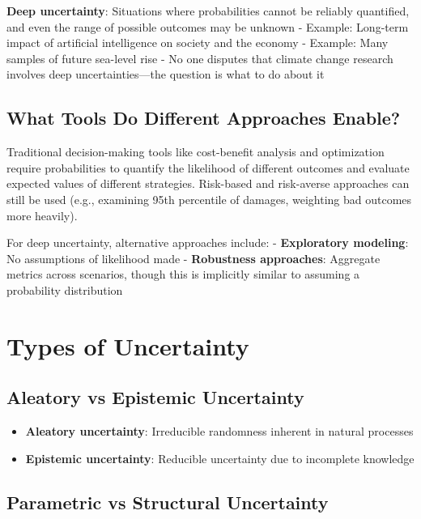 \documentclass[
  letterpaper,
  DIV=11,
  numbers=noendperiod]{scrreprt}
\providecommand{\tightlist}{%
  \setlength{\itemsep}{0pt}\setlength{\parskip}{0pt}}
\begin{document}
\textbf{Deep uncertainty}: Situations where probabilities cannot be
reliably quantified, and even the range of possible outcomes may be
unknown - Example: Long-term impact of artificial intelligence on
society and the economy - Example: Many samples of future sea-level rise
- No one disputes that climate change research involves deep
uncertainties---the question is what to do about it

\subsection{What Tools Do Different Approaches
Enable?}\label{what-tools-do-different-approaches-enable}

Traditional decision-making tools like cost-benefit analysis and
optimization require probabilities to quantify the likelihood of
different outcomes and evaluate expected values of different strategies.
Risk-based and risk-averse approaches can still be used (e.g., examining
95th percentile of damages, weighting bad outcomes more heavily).

For deep uncertainty, alternative approaches include: -
\textbf{Exploratory modeling}: No assumptions of likelihood made -
\textbf{Robustness approaches}: Aggregate metrics across scenarios,
though this is implicitly similar to assuming a probability distribution

\section{Types of Uncertainty}\label{types-of-uncertainty}

\subsection{Aleatory vs Epistemic
Uncertainty}\label{aleatory-vs-epistemic-uncertainty}

\begin{itemize}
\tightlist
\item
  \textbf{Aleatory uncertainty}: Irreducible randomness inherent in
  natural processes
\item
  \textbf{Epistemic uncertainty}: Reducible uncertainty due to
  incomplete knowledge
\end{itemize}

\subsection{Parametric vs Structural
Uncertainty}\label{parametric-vs-structural-uncertainty}
\end{document}
